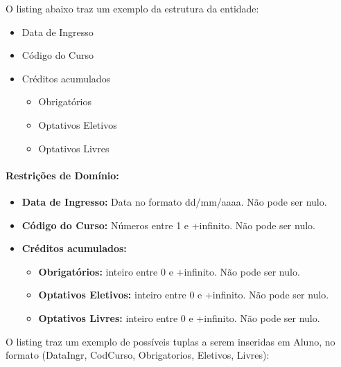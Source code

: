 \documentclass{report}
\begin{document}
  O listing abaixo traz um exemplo da estrutura da entidade:
\begin{itemize}
  \item Data de Ingresso
  \item Código do Curso
  \item Créditos acumulados
  \begin{itemize}
    \item Obrigatórios
    \item Optativos Eletivos
    \item Optativos Livres
  \end{itemize}
\end{itemize}
\paragraph{Restrições de Domínio:}
\begin{itemize}
  \item \textbf{Data de Ingresso:} Data no formato dd/mm/aaaa. Não pode ser nulo.
  \item \textbf{Código do Curso:} Números entre 1 e +infinito. Não pode ser nulo.
  \item \textbf{Créditos acumulados:}
  \begin{itemize}
    \item \textbf{Obrigatórios:} inteiro entre 0 e +infinito. Não pode ser nulo.
    \item \textbf{Optativos Eletivos:} inteiro entre 0 e +infinito. Não pode ser nulo.
    \item \textbf{Optativos Livres:} inteiro entre 0 e +infinito. Não pode ser nulo.
  \end{itemize}
\end{itemize}

O listing traz um exemplo de possíveis tuplas a serem inseridas em Aluno, no formato (DataIngr, CodCurso, Obrigatorios, Eletivos, Livres):
\end{document}
